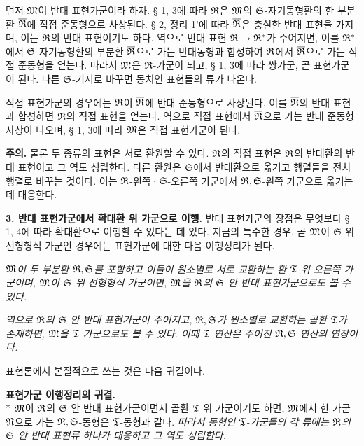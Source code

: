 먼저 \(\mathfrak M\)이 반대 표현가군이라 하자. § 1, 3에 따라 \(\mathfrak R\)은 \(\mathfrak M\)의 \(\mathfrak S\)-자기동형환의 한 부분환 \(\overline{\mathfrak R}\)에 직접 준동형으로 사상된다. § 2, 정리 1'에 따라 \(\overline{\mathfrak R}\)은 충실한 반대 표현을 가지며, 이는 \(\mathfrak R\)의 반대 표현이기도 하다. 역으로 반대 표현 \(\mathfrak R\to\mathfrak R^*\)가 주어지면, 이를 \(\mathfrak R^*\)에서 \(\mathfrak S\)-자기동형환의 부분환 \(\overline{\mathfrak R}\)으로 가는 반대동형과 합성하여 \(\mathfrak R\)에서 \(\overline{\mathfrak R}\)으로 가는 직접 준동형을 얻는다. 따라서 \(\mathfrak M\)은 \(\mathfrak R\)-가군이 되고, § 1, 3에 따라 쌍가군, 곧 표현가군이 된다. 다른 \(\mathfrak S\)-기저로 바꾸면 동치인 표현들의 류가 나온다.

직접 표현가군의 경우에는 \(\mathfrak R\)이 \(\overline{\mathfrak R}\)에 반대 준동형으로 사상된다. 이를 \(\overline{\mathfrak R}\)의 반대 표현과 합성하면 \(\mathfrak R\)의 직접 표현을 얻는다. 역으로 직접 표현에서 \(\overline{\mathfrak R}\)으로 가는 반대 준동형 사상이 나오며, § 1, 3에 따라 \(\mathfrak M\)은 직접 표현가군이 된다.

\noindent\textbf{주의.} 물론 두 종류의 표현은 서로 환원할 수 있다. \(\mathfrak R\)의 직접 표현은 \(\mathfrak R\)의 반대환의 반대 표현이고 그 역도 성립한다. 다른 환원은 \(\mathfrak S\)에서 반대환으로 옮기고 행렬들을 전치행렬로 바꾸는 것이다. 이는 \(\mathfrak R\)-왼쪽·\(\mathfrak S\)-오른쪽 가군에서 \(\mathfrak R,\mathfrak S\)-왼쪽 가군으로 옮기는 데 대응한다.

\noindent\textbf{3. 반대 표현가군에서 확대환 위 가군으로 이행.} 반대 표현가군의 장점은 무엇보다 § 1, 4에 따라 확대환으로 이행할 수 있다는 데 있다. 지금의 특수한 경우, 곧 \(\mathfrak M\)이 \(\mathfrak S\) 위 선형형식 가군인 경우에는 표현가군에 대한 다음 이행정리가 된다.

\emph{\(\mathfrak M\)이 두 부분환 \(\mathfrak R,\mathfrak S\)를 포함하고 이들이 원소별로 서로 교환하는 환 \(\mathfrak T\) 위 오른쪽 가군이며, \(\mathfrak M\)이 \(\mathfrak S\) 위 선형형식 가군이면, \(\mathfrak M\)을 \(\mathfrak R\)의 \(\mathfrak S\) 안 반대 표현가군으로도 볼 수 있다.}

\emph{역으로 \(\mathfrak R\)의 \(\mathfrak S\) 안 반대 표현가군이 주어지고, \(\mathfrak R,\mathfrak S\)가 원소별로 교환하는 곱환 \(\mathfrak T\)가 존재하면, \(\mathfrak M\)을 \(\mathfrak T\)-가군으로도 볼 수 있다. 이때 \(\mathfrak T\)-연산은 주어진 \(\mathfrak R,\mathfrak S\)-연산의 연장이다.}

표현론에서 본질적으로 쓰는 것은 다음 귀결이다.

\noindent\textbf{표현가군 이행정리의 귀결.}\\*
\(\mathfrak M\)이 \(\mathfrak R\)의 \(\mathfrak S\) 안 반대 표현가군이면서 곱환 \(\mathfrak T\) 위 가군이기도 하면, \(\mathfrak M\)에서 한 가군 \(\mathfrak N\)으로 가는 \(\mathfrak R,\mathfrak S\)-동형은 \(\mathfrak T\)-동형과 같다. \emph{따라서 동형인 \(\mathfrak T\)-가군들의 각 류에는 \(\mathfrak R\)의 \(\mathfrak S\) 안 반대 표현류 하나가 대응하고 그 역도 성립한다.}

